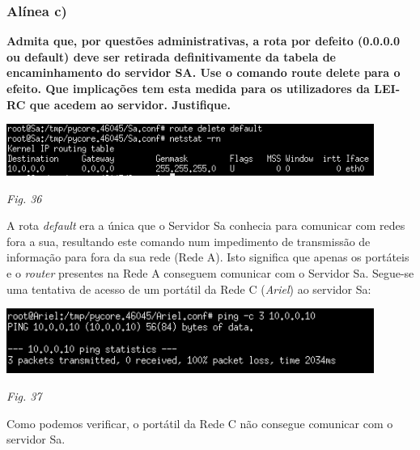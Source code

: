 \documentclass{article}
\begin{document}
\subsubsection{Alínea c)}
\textbf{Admita que, por questões administrativas, a rota por defeito (0.0.0.0 ou default) deve ser retirada definitivamente
da tabela de encaminhamento do servidor SA. Use o comando route delete para o efeito. Que implicações tem
esta medida para os utilizadores da LEI-RC que acedem ao servidor. Justifique.}
\begin{center}
    \includegraphics[width = 12cm]{23.png}\par\caption{\textit{Fig. 36}}
\end{center}
\hspace{0.5cm}A rota \textit{default} era a única que o Servidor Sa conhecia para comunicar com redes fora a sua, resultando este comando num impedimento de transmissão de informação para fora da sua rede (Rede A). Isto significa que apenas os portáteis e o \textit{router} presentes na Rede A conseguem comunicar com o Servidor Sa.
Segue-se uma tentativa de acesso de um portátil da Rede C (\textit{Ariel}) ao servidor Sa:
\begin{center}
    \includegraphics[width = 12cm]{232.png}\par\caption{\textit{Fig. 37}}
\end{center}
\hspace{0.5cm}Como podemos verificar, o portátil da Rede C não consegue comunicar com o servidor Sa.
\end{document}
